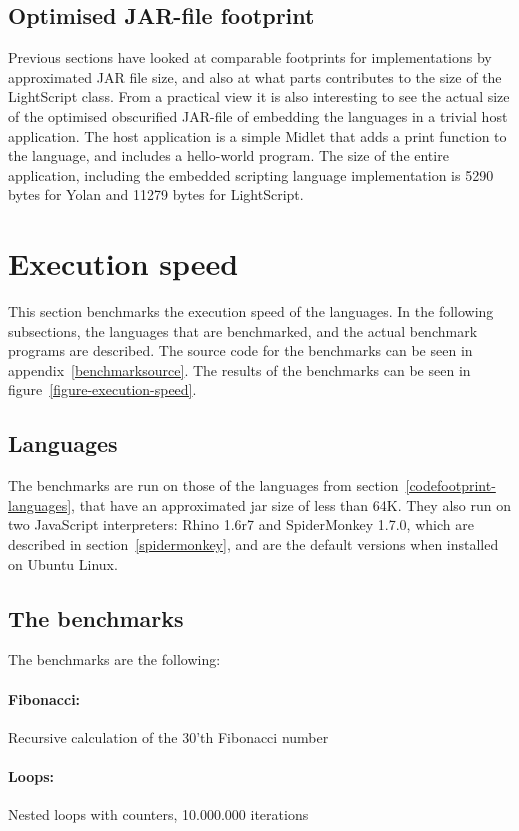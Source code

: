 \documentclass[11pt]{report}
\begin{document}
\subsection{Optimised JAR-file footprint}
Previous sections have looked at comparable footprints for implementations by approximated JAR file size, and also at what parts contributes to the size of the LightScript class.
From a practical view it is also interesting to see the actual size of the optimised obscurified JAR-file of embedding the languages in a trivial host application.
The host application is a simple Midlet that adds a print function to the language, and includes a hello-world program.
The size of the entire application, including the embedded scripting language implementation is 5290 bytes for Yolan and 11279 bytes for LightScript. 

\section{Execution speed}
This section benchmarks the execution speed of the languages. 
In the following subsections, the languages that are benchmarked, and the actual benchmark programs are described.
The source code for the benchmarks can be seen in appendix~\ref{benchmarksource}.
The results of the benchmarks can be seen in figure~\ref{figure-execution-speed}.

\subsection{Languages}
The benchmarks are run on those of the languages from section~\ref{codefootprint-languages}, that have an approximated jar size of less than 64K. They also run on two JavaScript interpreters: Rhino 1.6r7 and SpiderMonkey 1.7.0, which are described in section~\ref{spidermonkey}, and are the default versions when installed on Ubuntu Linux.

\subsection{The benchmarks}
The benchmarks are the following:

\paragraph{Fibonacci:} Recursive calculation of the 30'th Fibonacci number
\paragraph{Loops:} Nested loops with counters, 10.000.000 iterations
\end{document}
